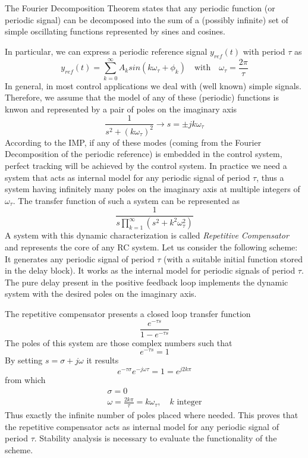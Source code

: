 \documentclass{book}
\begin{document}
The Fourier Decomposition Theorem states that any periodic function (or periodic signal) can be decomposed into the sum of a (possibly infinite) set of simple oscillating functions represented by sines and cosines. 

In particular, we can express a periodic reference signal $y_{ref}(t)$ with period $\tau$ as 
\[
    y_{ref}(t) = \displaystyle\sum_{k=0}^{\infty}A_ksin(k\omega_\tau+\phi_k) \quad \text{with} \quad \omega_\tau=\displaystyle\frac{2\pi}{\tau}
\]
In general, in most control applications we deal with (well known) simple signals. Therefore, we assume that the model of any of these (periodic) functions is knwon and represented by a pair of poles on the imaginary axis 
\[
    \displaystyle\frac{1}{s^2+(k\omega_\tau)^2} \longrightarrow s = \pm jk\omega_\tau
\]
According to the IMP, if any of these modes (coming from the Fourier Decomposition of the periodic reference) is embedded in the control system, perfect tracking will be achieved by the control system. In practice we need a system that acts as internal model for any periodic signal of period $\tau$, thus a system having infinitely many poles on the imaginary axis at multiple integers of $\omega_\tau$.
The transfer function of such a system can be represented as 
\[
    \displaystyle\frac{1}{s\prod_{k=1}^\infty (s^2+k^2\omega_\tau^2)}
\]
A system with this dynamic characterization is called \emph{Repetitive Compensator} and represents the core of any RC system. Let us consider the following scheme: 
It generates any periodic signal of period $\tau$ (with a suitable initial function stored in the delay block). It works as the internal model for periodic signals of period $\tau$. The pure delay present in the positive feedback loop implements the dynamic system with the desired poles on the imaginary axis. 

The repetitive compensator presents a closed loop transfer function 
\[
    \displaystyle\frac{e^{-\tau s}}{1-e^{-\tau s}}
\]
The poles of this system are those complex numbers such that 
\[
    e^{-\tau s} = 1 
\]
By setting $s = \sigma+j\omega$ it results 
\[
    e^{-\tau\sigma} e ^{-j \omega \tau} = 1 = e^{j2k\pi}
\]
from which 
\begin{gather*}
    \sigma = 0 \\
    \omega = \displaystyle\frac{2k\pi}{\tau} = k \omega_\tau, \quad k \text{ integer}
\end{gather*}
Thus exactly the infinite number of poles placed where needed. This proves that the repetitive compensator acts as internal model for any periodic signal of period $\tau$. Stability analysis is necessary to evaluate the functionality of the scheme. 
\end{document}
